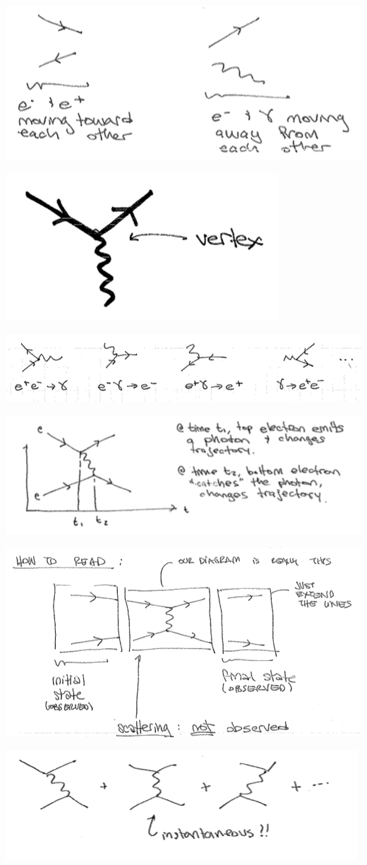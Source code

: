 \documentclass[12pt]{article}
\numberwithin{equation}{section}    %
\begin{document}
\includegraphics[width=.6\textwidth]{Lec1_noaxis}


\includegraphics[width=.3\textwidth]{Lec1_vertex}

\includegraphics[width=\textwidth]{Lec1_3pt}

\includegraphics[width=\textwidth]{Lec1_order}


\includegraphics[width=\textwidth]{Lec1_diagram}

\includegraphics[width=\textwidth]{Lec1_sum}
\end{document}
